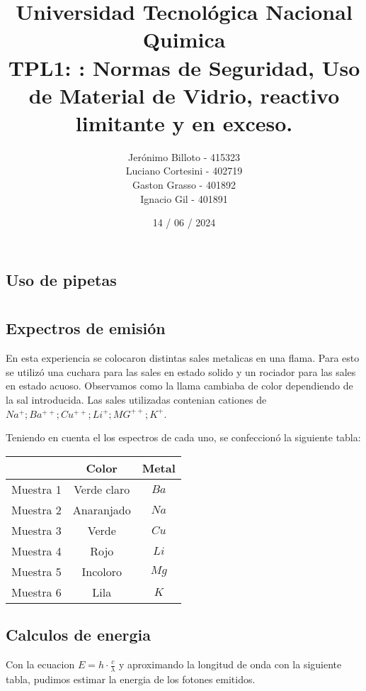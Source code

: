 \documentclass[12pt]{report}
\title{%
  \fontsize{25}{0}\selectfont Universidad Tecnológica Nacional \\
  \fontsize{22}{30}\selectfont Quimica \\
  \fontsize{18}{25}\selectfont TPL1: : Normas de Seguridad, Uso de Material de Vidrio, reactivo limitante y en exceso.
}
\author{
  Jerónimo Billoto - 415323\\
  Luciano Cortesini - 402719\\
  Gaston Grasso - 401892\\
  Ignacio Gil - 401891\\
}
\date{14 / 06 / 2024}
\begin{document}
\maketitle
\chapter{}
\section{Uso de pipetas}

\chapter{}
\section{Expectros de emisión}
En esta experiencia se colocaron distintas sales metalicas en una flama.
Para esto se utilizó una cuchara para las sales en estado solido y un rociador para las sales en 
estado acuoso.
Observamos como la llama cambiaba de color dependiendo de la sal introducida.
Las sales utilizadas contenian cationes de $Na^{+} ; Ba^{++} ; Cu^{++} ; Li^{+} ; MG^{++} ; K^{+}$.

Teniendo en cuenta el los espectros de cada uno, se confeccionó la siguiente tabla:

\begin{table}[h!]
\centering
\begin{tabular}{|c|c|c|}
  \hline
  \textbf{} & \textbf{Color} & \textbf{Metal} \\
  \hline
  Muestra 1 & Verde claro & $Ba$ \\
  \hline
  Muestra 2 & Anaranjado & $Na$\\
  \hline
  Muestra 3 & Verde & $Cu$ \\
  \hline
  Muestra 4 & Rojo & $Li$\\
  \hline
  Muestra 5 & Incoloro & $Mg$\\
  \hline
  Muestra 6 & Lila & $K$ \\
  \hline
\end{tabular}
\label{tab:colores_metales}
\end{table}

\section{Calculos de energia}
Con la ecuacion $E=h\cdot\frac{c}{\lambda}$ y aproximando la longitud de onda con la siguiente
tabla, pudimos estimar la energia de los fotones emitidos.
\end{document}
